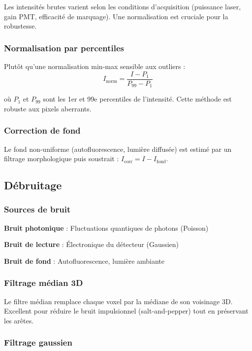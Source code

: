 Les intensités brutes varient selon les conditions d'acquisition (puissance laser, gain PMT, efficacité de marquage). Une normalisation est cruciale pour la robustesse.

\subsubsection{Normalisation par percentiles}

Plutôt qu'une normalisation min-max sensible aux outliers :
\[
I_{\text{norm}} = \frac{I - P_1}{P_{99} - P_1}
\]

où $P_1$ et $P_{99}$ sont les 1er et 99e percentiles de l'intensité. Cette méthode est robuste aux pixels aberrants.

\subsubsection{Correction de fond}

Le fond non-uniforme (autofluorescence, lumière diffusée) est estimé par un filtrage morphologique puis soustrait : $I_{\text{corr}} = I - I_{\text{fond}}$.

\subsection{Débruitage}

\subsubsection{Sources de bruit}

\textbf{Bruit photonique} : Fluctuations quantiques de photons (Poisson)

\textbf{Bruit de lecture} : Électronique du détecteur (Gaussien)

\textbf{Bruit de fond} : Autofluorescence, lumière ambiante

\subsubsection{Filtrage médian 3D}

Le filtre médian remplace chaque voxel par la médiane de son voisinage 3D. Excellent pour réduire le bruit impulsionnel (salt-and-pepper) tout en préservant les arêtes.

\subsubsection{Filtrage gaussien}

